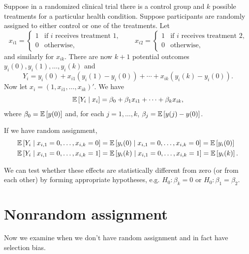 \begin{remark}
	Suppose in a randomized clinical trial there is a control group and $k$ possible treatments for a particular health condition. Suppose participants are randomly assigned to either control or one of the treatments. Let
	\[
		x_{i1} =
		\begin{cases}
			1 & \text{if $i$ receives treatment 1,} \\
			0 & \text{otherwise,}
		\end{cases}
		\qquad
		x_{i2} =
		\begin{cases}
			1 & \text{if $i$ receives treatment 2,} \\
			0 & \text{otherwise,}
		\end{cases}
	\]
	and similarly for $x_{ik}$. There are now $k+1$ potential outcomes $y_i(0), y_i(1), \ldots, y_i(k)$ and
	\[
		Y_i = y_i(0) + x_{i1}\left(y_i(1)-y_i(0)\right) + \cdots + x_{ik}\left(y_i(k)-y_i(0)\right)
	.\]
	Now let $x_i = \left(1, x_{i1}, \ldots, x_{ik}\right)'$. We have
	\[
		\mathbb{E}\left[Y_i \mid x_i\right] = \beta_0 + \beta_1 x_{i1} + \cdots + \beta_k x_{ik}
	,\]
	where $\beta_0 = \mathbb{E}\left[y(0)\right]$ and, for each $j = 1, \ldots, k$, $\beta_j = \mathbb{E}\left[y(j)-y(0)\right]$.

	If we have random assignment, 
	\begin{align*}
		\mathbb{E}\left[Y_i \mid x_{i,1} = 0,\ldots,x_{i,k} = 0\right] &= \mathbb{E}\left[y_i(0) \mid x_{i,1} = 0 ,\ldots, x_{i,k} = 0\right] = \mathbb{E}\left[y_i(0)\right] \\
		\mathbb{E}\left[Y_i \mid x_{i,1} = 0 ,\ldots,x_{i,k} = 1\right] &= \mathbb{E}\left[y_i(k) \mid x_{i,1}= 0,\ldots,x_{i,k} = 1\right] = \mathbb{E}\left[y_i(k)\right] 
	.\end{align*}

	We can test whether these effects are statistically different from zero (or from each other) by forming appropriate hypotheses, e.g. $H_0:\beta_k=0$ or $H_0:\beta_1=\beta_2$.
\end{remark}

\section{Nonrandom assignment}

Now we examine when we don't have random assignment and in fact have selection bias.


